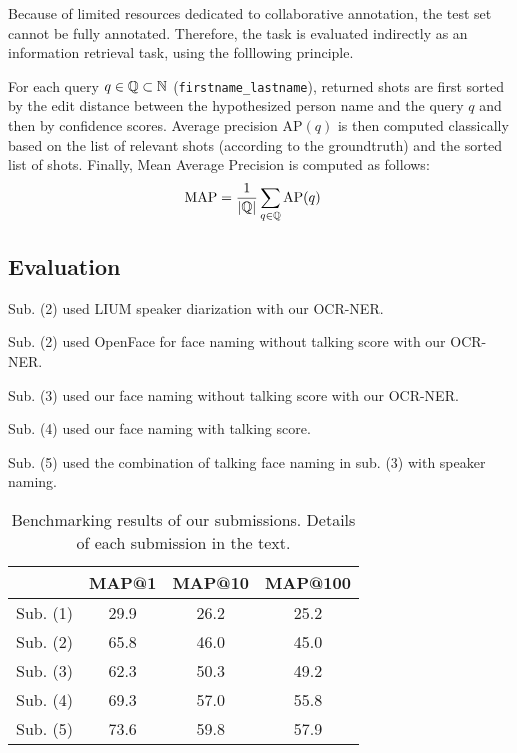 Because of limited resources dedicated to collaborative annotation, the test set cannot be fully annotated. Therefore, the task is evaluated indirectly as an information retrieval task, using the folllowing principle.

For each query $q \in \mathbb{Q} \subset \mathbb{N}$ (\texttt{first\-name\_lastname}), returned shots are first sorted by the edit distance between the hypothesized person name and the query $q$ and then by confidence scores.
Average precision $\text{AP}(q)$ is then computed classically based on the list of relevant shots (according to the groundtruth) and the sorted list of shots. Finally, Mean Average Precision is computed as follows:
\begin{align}
            \text{MAP} & = \frac{1}{|\mathbb{Q}|} \sum_{q \in \mathbb{Q}} \text{AP}(q) \nonumber
\end{align}

\subsection{Evaluation}

\begin{compactitem}
  \item Sub. (2) used LIUM speaker diarization with our OCR-NER.
  \item Sub. (2) used OpenFace for face naming without talking score with our OCR-NER.
	\item Sub. (3) used our face naming without talking score with our OCR-NER.
	\item Sub. (4) used our face naming with talking score. 
	\item Sub. (5) used the combination of talking face naming in sub. (3) with speaker naming.
\end{compactitem}

\begin{table}[tb]
\centering
\begin{tabular}{c|c|c|c|}
\cline{2-4}
                                & MAP@1  & MAP@10 & MAP@100  \\ \hline
 \multicolumn{1}{|c|}{Sub. (1)} & 29.9   & 26.2   & 25.2 \\ \hline
 \multicolumn{1}{|c|}{Sub. (2)} & 65.8   & 46.0   & 45.0 \\ \hline
 \multicolumn{1}{|c|}{Sub. (3)} & 62.3   & 50.3   & 49.2 \\ \hline
 \multicolumn{1}{|c|}{Sub. (4)} & 69.3   & 57.0   & 55.8 \\ \hline
 \multicolumn{1}{|c|}{Sub. (5)} & 73.6   & 59.8   & 57.9 \\ \hline

\end{tabular}
\vspace*{-2mm}
\caption{Benchmarking results of our submissions. Details of each submission in the text.}
\vspace*{-2mm}
\label{tab:mediaeval}
\end{table}


